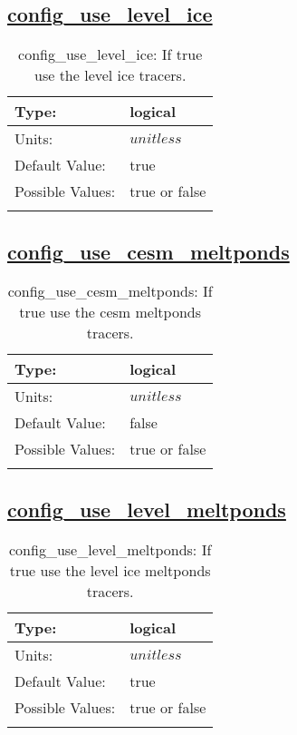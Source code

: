 \subsection[config\_use\_level\_ice]{\hyperref[sec:nm_tab_column_tracers]{config\_use\_level\_ice}}
\label{subsec:nm_sec_config_use_level_ice}
\begin{center}
\begin{longtable}{| p{2.0in} || p{4.0in} |}
    \hline
    Type: & logical \\
    \hline
    Units: & $unitless$ \\
    \hline
    Default Value: & true \\
    \hline
    Possible Values: & true or false \\
    \hline
    \caption{config\_use\_level\_ice: If true use the level ice tracers.}
\end{longtable}
\end{center}
\subsection[config\_use\_cesm\_meltponds]{\hyperref[sec:nm_tab_column_tracers]{config\_use\_cesm\_meltponds}}
\label{subsec:nm_sec_config_use_cesm_meltponds}
\begin{center}
\begin{longtable}{| p{2.0in} || p{4.0in} |}
    \hline
    Type: & logical \\
    \hline
    Units: & $unitless$ \\
    \hline
    Default Value: & false \\
    \hline
    Possible Values: & true or false \\
    \hline
    \caption{config\_use\_cesm\_meltponds: If true use the cesm meltponds tracers.}
\end{longtable}
\end{center}
\subsection[config\_use\_level\_meltponds]{\hyperref[sec:nm_tab_column_tracers]{config\_use\_level\_meltponds}}
\label{subsec:nm_sec_config_use_level_meltponds}
\begin{center}
\begin{longtable}{| p{2.0in} || p{4.0in} |}
    \hline
    Type: & logical \\
    \hline
    Units: & $unitless$ \\
    \hline
    Default Value: & true \\
    \hline
    Possible Values: & true or false \\
    \hline
    \caption{config\_use\_level\_meltponds: If true use the level ice meltponds tracers.}
\end{longtable}
\end{center}

